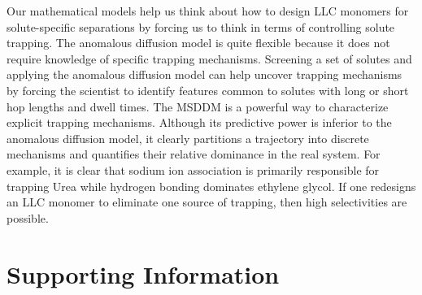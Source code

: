 \documentclass{article}
\begin{document}
  Our mathematical models help us think about how to design LLC monomers for 
  solute-specific separations by forcing us to think in terms of controlling 
  solute trapping. The anomalous diffusion model is quite flexible because it
  does not require knowledge of specific trapping mechanisms. Screening a set
  of solutes and applying the anomalous diffusion model can help uncover
  trapping mechanisms by forcing the scientist to identify features common 
  to solutes with long or short hop lengths and dwell times. The MSDDM is a 
  powerful way to characterize explicit trapping mechanisms. Although its
  predictive power is inferior to the anomalous diffusion model, it clearly
  partitions a trajectory into discrete mechanisms and quantifies their
  relative dominance in the real system. For example, it is clear that 
  sodium ion association is primarily responsible for trapping Urea while 
  hydrogen bonding dominates ethylene glycol. If one redesigns an LLC monomer
  to eliminate one source of trapping, then high selectivities are possible.
  
%  
%  
%
%  
  
  
  \section*{Supporting Information}
\end{document}
